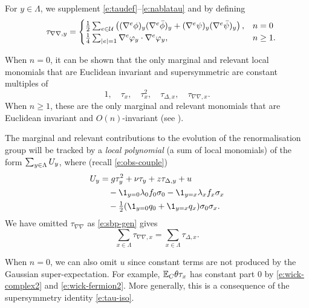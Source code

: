 For $y \in \Lambda$, we supplement \eqref{e:taudef}--\eqref{e:nablatau} and 
by defining
\begin{equation}
\label{e:tauphi2}
\quad \tau_{\nabla\nabla,y}
	=
\begin{cases}
\frac 12 \sum_{e \in \mathcal{U}}
\left(
	(\nabla^e \phi)_y (\nabla^e \bar\phi)_y +
	(\nabla^e \psi)_y (\nabla^e \bar\psi)_y
\right),
	& n = 0 \\
\frac{1}{4} \sum_{|e| = 1} \nabla^e \varphi_y \cdot \nabla^e \varphi_y,
	& n \ge 1.
\end{cases}
\end{equation}

When $n = 0$, it can be shown that the only marginal and relevant local monomials
that are Euclidean invariant and supersymmetric are constant multiples of
\begin{equation}
1, \quad \tau_x, \quad \tau_x^2, \quad \tau_{\Delta,x}, \quad \tau_{\nabla\nabla,x}.
\end{equation}
When $n \ge 1$, these are the only marginal and relevant monomials that are Euclidean
invariant and $O(n)$-invariant (see \cite{BBS-rg-pt}).

The marginal and relevant contributions to the evolution of the renormalisation group
will be tracked by a \emph{local polynomial} (a sum of local monomials) of the form
$\sum_{y\in\Lambda} U_y$, where (recall \eqref{e:obs-couple})
\begin{align}
\lbeq{Vy}
\Vc_y
	&=
g \tau_y^2 + \nu \tau_y + z \tau_{\Delta,y}
	+ u
		\nnb&\quad
	- \1_{y=\pp}\lambda_{\pp} f_0 \sigma_0
	- \1_{y=\qq}\lambda_{\qq} f_x \sigma_x
		\nnb&\quad
	- \textstyle{\frac 12} (\1_{y=\pp} q_\pp + \1_{y=\qq}q_\qq )\sigma_\pp\sigma_\qq.
\end{align}
We have omitted $\tau_{\nabla\nabla}$ as \eqref{e:sbp-gen} gives
\begin{equation}
\label{e:nabla-delta}
\sum_{x\in\Lambda} \tau_{\nabla\nabla,x} = \sum_{x\in\Lambda} \tau_{\Delta,x}.
\end{equation}

\begin{rk}
\label{rk:noconst}
When $n = 0$, we can also omit $u$ since constant terms are not produced by the 
Gaussian super-expectation. For example, $\mathbb{E}_C\theta \tau_x$ has constant part
$0$ by \eqref{e:wick-complex2} and \eqref{e:wick-fermion2}. More generally,
this is a consequence of the supersymmetry identity \eqref{e:tau-iso}.
\end{rk}

